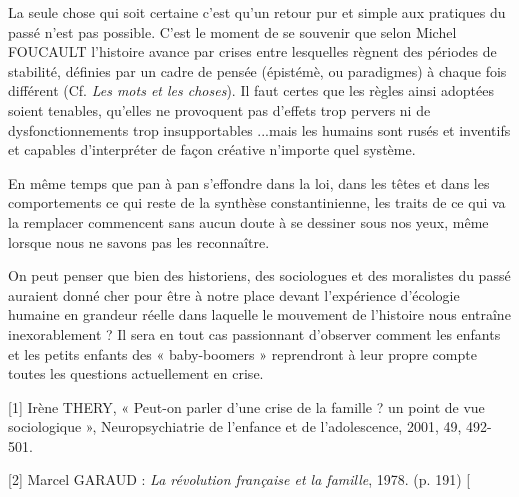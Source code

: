  La seule chose qui soit certaine c'est qu'un retour pur et simple aux pratiques du passé n'est pas possible. C'est le moment de se souvenir que selon Michel FOUCAULT l'histoire avance par crises entre lesquelles règnent des périodes de stabilité, définies par un cadre de pensée (épistémè, ou paradigmes) à chaque fois différent (Cf. \emph{Les mots et les choses}). Il faut certes que les règles ainsi adoptées soient tenables, qu'elles ne provoquent pas d'effets trop pervers ni de dysfonctionnements trop insupportables ...mais les humains sont rusés et inventifs et capables d'interpréter de façon créative n'importe quel système.

 En même temps que pan à pan s'effondre dans la loi, dans les têtes et dans les comportements ce qui reste de la synthèse constantinienne, les traits de ce qui va la remplacer commencent sans aucun doute à se dessiner sous nos yeux, même lorsque nous ne savons pas les reconnaître.

On peut penser que bien des historiens, des sociologues et des moralistes du passé auraient donné cher pour être à notre place devant l'expérience d'écologie humaine en grandeur réelle dans laquelle le mouvement de l'histoire nous entraîne inexorablement ? Il sera en tout cas passionnant d'observer comment les enfants et les petits enfants des « baby-boomers » reprendront à leur propre compte toutes les questions actuellement en crise.
 
 
 
[1] Irène THERY, « Peut-on parler d'une crise de la famille ? un point de vue sociologique », Neuropsychiatrie de l'enfance et de l'adolescence, 2001, 49, 492-501.

[2] Marcel GARAUD : \emph{La révolution française et la famille}, 1978. (p. 191)
[